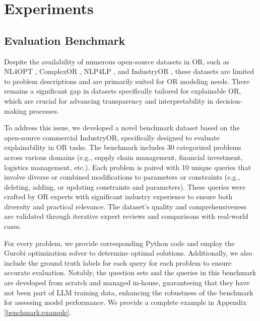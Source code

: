\section{Experiments}

\subsection{Evaluation Benchmark}
Despite the availability of numerous open-source datasets in OR, such as NL4OPT \citep{ramamonjison2023nl4opt}, ComplexOR \citep{xiao2023chain}, NLP4LP \citep{holzer2024grid}, and IndustryOR \citep{tang2024orlm}, these datasets are limited to problem descriptions and are primarily suited for OR modeling needs. There remains a significant gap in datasets specifically tailored for explainable OR, which are crucial for advancing transparency and interpretability in decision-making processes.

To address this issue, we developed a novel benchmark dataset based on the open-source commercial IndustryOR, specifically designed to evaluate explainability in OR tasks. The benchmark includes 30 categorized problems across various domains (e.g., supply chain management, financial investment, logistics management, etc.). Each problem is paired with 10 unique queries that involve diverse or combined modifications to parameters or constraints (e.g., deleting, adding, or updating constraints and parameters). These queries were crafted by OR experts with significant industry experience to ensure both diversity and practical relevance. The dataset’s quality and comprehensiveness are validated through iterative expert reviews and comparisons with real-world cases.

For every problem, we provide corresponding Python code and employ the Gurobi optimization solver \citep{bixby2007gurobi} to determine optimal solutions. Additionally, we also include the ground truth labels for each query for each problem to ensure accurate evaluation. Notably, the question sets and the queries in this benchmark are developed from scratch and managed in-house, guaranteeing that they have not been part of LLM training data, enhancing the robustness of the benchmark for assessing model performance. We provide a complete example in Appendix \ref{benchmark:example}.

